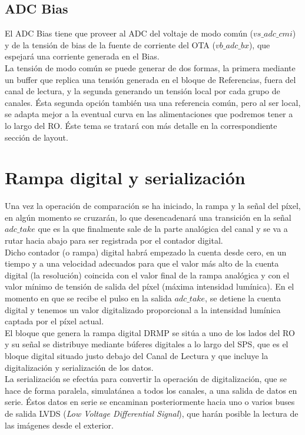 \subsection{ADC Bias}

El ADC Bias tiene que proveer al ADC del voltaje de modo común ($vs\_adc\_cmi$) y
de la tensión de bias de la fuente de corriente del OTA ($vb\_adc\_bx$), que espejará
una corriente generada en el Bias.\\

La tensión de modo común se puede generar de dos formas, la primera mediante un
buffer que replica una tensión generada en el bloque de Referencias, fuera del
canal de lectura, y la segunda generando un tensión local por cada grupo de canales.
Ésta segunda opción también usa una referencia común, pero al ser local, se adapta
mejor a la eventual curva en las alimentaciones que podremos tener a lo largo
del RO. Éste tema se tratará con más detalle en la correspondiente sección de layout.\\

\section{Rampa digital y serialización}

Una vez la operación de comparación se ha iniciado, la rampa y la señal del píxel,
en algún momento se cruzarán, lo que desencadenará una transición en la señal
$adc\_take$ que es la que finalmente sale de la parte analógica del canal y se va
a rutar hacia abajo para ser registrada por el contador digital.\\

Dicho contador (o rampa) digital habrá empezado la cuenta desde cero, en un tiempo y a una
velocidad adecuados para que el valor más alto de la cuenta digital (la resolución)
coincida con el valor final de la rampa analógica y con el valor mínimo de tensión
de salida del píxel (máxima intensidad lumínica). En el momento en que se recibe
el pulso en la salida $adc\_take$, se detiene la cuenta digital y tenemos un valor
digitalizado proporcional a la intensidad lumínica captada por el píxel actual.\\

El bloque que genera la rampa digital DRMP se sitúa a uno de los lados del RO y
su señal se distribuye mediante búferes digitales a lo largo del SPS, que es
el bloque digital situado justo debajo del Canal de Lectura y que incluye la digitalización
y serialización de los datos.\\

La serialización se efectúa para convertir la operación de digitalización, que se
hace de forma paralela, simulatánea a todos los canales, a una salida de datos en serie.
Éstos datos en serie se encaminan posteriormente hacia uno o varios buses de salida LVDS
(\textit{Low Voltage Differential Signal}), que harán posible la lectura de las imágenes
desde el exterior.\\
